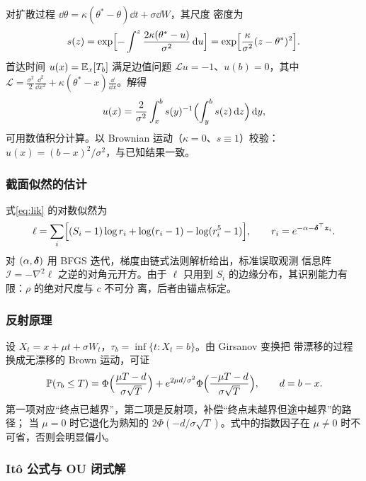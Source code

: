 对扩散过程 $\dd\theta=\kappa(\theta^{*}-\theta)\dd t+\sigma\dd W$，其尺度
密度为
\begin{equation}
s(z)=\exp\Bigl[-\int^{z}\frac{2\kappa(\theta^{*}-u)}{\sigma^2}\,\mathrm{d} u\Bigr]
=\exp\Bigl[\frac{\kappa}{\sigma^2}(z-\theta^{*})^2\Bigr].
\end{equation}
首达时间 $u(x)=\mathbb{E}_x[T_b]$ 满足边值问题 $\mathcal{L}u=-1$、$u(b)=0$，其中
$\mathcal{L}=\frac{\sigma^2}{2}\frac{\dd^2}{\dd x^2}
+\kappa(\theta^{*}-x)\frac{\dd}{\dd x}$。解得
\begin{equation}
u(x)=\frac{2}{\sigma^2}\int_{x}^{b}s(y)^{-1}
\Bigl(\int_{y}^{b}s(z)\,\mathrm{d} z\Bigr)\,\mathrm{d} y ,
\label{eq:app-ou}
\end{equation}
可用数值积分计算。以 Brownian 运动（$\kappa=0$、$s\equiv1$）校验：
$u(x)=(b-x)^2/\sigma^2$，与已知结果一致。

\subsubsection{截面似然的估计}

式\eqref{eq:lik} 的对数似然为
\begin{equation}
\ell=\sum_i\Bigl[(S_i-1)\log r_i+\log(r_i-1)-\log(r_i^5-1)\Bigr],
\qquad r_i=e^{-\alpha-\bm{\delta}^{\top}\bm{z}_i}.
\end{equation}
对 $(\alpha,\bm{\delta})$ 用 BFGS 迭代，梯度由链式法则解析给出，标准误取观测
信息阵 $\mathcal{I}=-\nabla^2\ell$ 之逆的对角元开方。由于 $\ell$
只用到 $S_i$ 的边缘分布，其识别能力有限：$\rho$ 的绝对尺度与 $c$ 不可分
离，后者由锚点标定。

\subsubsection{反射原理}

设 $X_t=x+\mu t+\sigma W_t$，$\tau_b=\inf\{t:X_t=b\}$。由 Girsanov 变换把
带漂移的过程换成无漂移的 Brown 运动，可证
\begin{equation}
\mathbb{P}(\tau_b\le T)=\Phi\Bigl(\frac{\mu T-d}{\sigma\sqrt{T}}\Bigr)
+e^{2\mu d/\sigma^{2}}\Phi\Bigl(\frac{-\mu T-d}{\sigma\sqrt{T}}\Bigr),
\qquad d=b-x .
\end{equation}
第一项对应“终点已越界”，第二项是反射项，补偿“终点未越界但途中越界”的路径；
当 $\mu=0$ 时它退化为熟知的 $2\Phi(-d/\sigma\sqrt{T})$。式中的指数因子在
$\mu\neq0$ 时不可省，否则会明显偏小。

\subsubsection{Itô 公式与 OU 闭式解}

